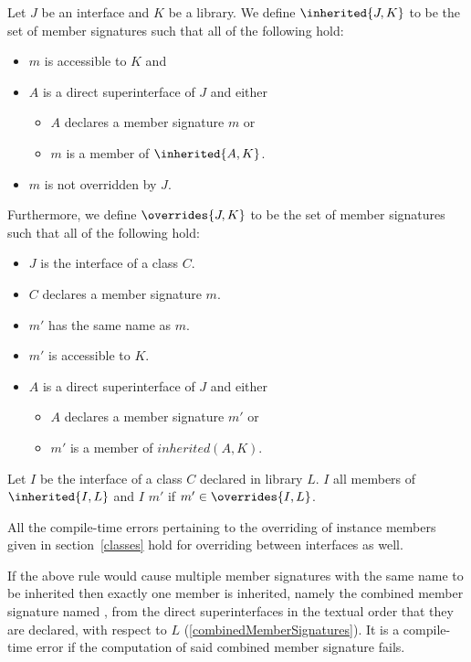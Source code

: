 \documentclass[makeidx]{article}
\begin{document}
\LMHash{}%
%
Let $J$ be an interface and $K$ be a library.
We define $\inherited{J, K}$ to be the set of member signatures
such that all of the following hold:
\begin{itemize}
\item $m$ is accessible to $K$ and
\item $A$ is a direct superinterface of $J$ and either
  \begin{itemize}
  \item $A$ declares a member signature $m$ or
  \item $m$ is a member of $\inherited{A, K}$.
  \end{itemize}
\item $m$ is not overridden by $J$.
\end{itemize}

\LMHash{}%
Furthermore, we define $\overrides{J, K}$ to be
the set of member signatures 
such that all of the following hold:
\begin{itemize}
\item $J$ is the interface of a class $C$.
\item $C$ declares a member signature $m$.
\item $m'$ has the same name as $m$.
\item $m'$ is accessible to $K$.
\item $A$ is a direct superinterface of $J$ and either
  \begin{itemize}
  \item $A$ declares a member signature $m'$ or
  \item $m'$ is a member of $inherited(A, K)$.
  \end{itemize}
\end{itemize}

\LMHash{}%
Let $I$ be the interface of a class $C$ declared in library $L$.
$I$  all members of $\inherited{I, L}$
and $I$  $m'$ if $m' \in \overrides{I, L}$.

\LMHash{}%
All the compile-time errors pertaining to the overriding of instance members
given in section~\ref{classes} hold for overriding between interfaces as well.

\LMHash{}%
If the above rule would cause multiple member signatures
with the same name \id{} to be inherited then
exactly one member is inherited, namely
the combined member signature named \id,
from the direct superinterfaces
in the textual order that they are declared,
with respect to $L$
(\ref{combinedMemberSignatures}).
It is a compile-time error
if the computation of said combined member signature fails.
\end{document}
